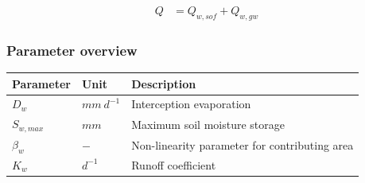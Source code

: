 \begin{align}
	Q &= Q_{w,sof}+Q_{w,gw}
\end{align}

\newpage
\subsubsection{Parameter overview}
\begin{table}[htbp]
  \centering
    \begin{tabular}{lll}
    \toprule
    Parameter & Unit  & Description \\
    \midrule
    $D_w$ & $mm~d^{-1}$ & Interception evaporation  \\
    $S_{w,max}$ & $mm$  & Maximum soil moisture storage \\
    $\beta_w$ & $-$   & Non-linearity parameter for contributing area \\
    $K_w$ & $d^{-1}$ & Runoff coefficient \\
    \bottomrule
    \end{tabular}%
  \label{tab:addlabel}%
\end{table}%
